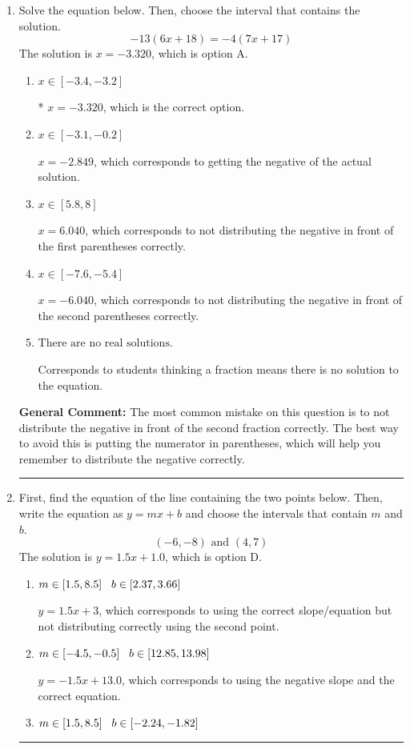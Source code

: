 \documentclass{extbook}[14pt]
\newcommand{\litem}[1]{\item #1

\rule{\textwidth}{0.4pt}}
\begin{document}
\begin{enumerate}\litem{
Solve the equation below. Then, choose the interval that contains the solution.
\[ -13(6x + 18) = -4(7x + 17) \]
The solution is \( x = -3.320 \), which is option A.\begin{enumerate}[label=\Alph*.]
\item \( x \in [-3.4, -3.2] \)

* $x = -3.320$, which is the correct option.
\item \( x \in [-3.1, -0.2] \)

$x = -2.849$, which corresponds to getting the negative of the actual solution.
\item \( x \in [5.8, 8] \)

$x = 6.040$, which corresponds to not distributing the negative in front of the first parentheses correctly.
\item \( x \in [-7.6, -5.4] \)

$x = -6.040$, which corresponds to not distributing the negative in front of the second parentheses correctly.
\item \( \text{There are no real solutions.} \)

Corresponds to students thinking a fraction means there is no solution to the equation.
\end{enumerate}

\textbf{General Comment:} The most common mistake on this question is to not distribute the negative in front of the second fraction correctly. The best way to avoid this is putting the numerator in parentheses, which will help you remember to distribute the negative correctly.
}
\litem{
First, find the equation of the line containing the two points below. Then, write the equation as $ y=mx+b $ and choose the intervals that contain $m$ and $b$.
\[ (-6, -8) \text{ and } (4, 7) \]
The solution is \( y = 1.5x + 1.0 \), which is option D.\begin{enumerate}[label=\Alph*.]
\item \( m \in [1.5, 8.5] \hspace*{3mm} b \in [2.37, 3.66] \)

 $y = 1.5x + 3$, which corresponds to using the correct slope/equation but not distributing correctly using the second point.
\item \( m \in [-4.5, -0.5] \hspace*{3mm} b \in [12.85, 13.98] \)

 $y = -1.5x + 13.0$, which corresponds to using the negative slope and the correct equation.
\item \( m \in [1.5, 8.5] \hspace*{3mm} b \in [-2.24, -1.82] \)


\end{enumerate}}
\end{enumerate}
\end{document}
